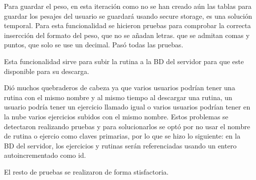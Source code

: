 Para guardar el peso, en esta iteración como no se han creado aún las tablas para guardar los pesajes del usuario se guardará usando secure storage, es una solución temporal. Para esta funcionalidad se hicieron pruebas para comprobar la correcta insercción del formato del peso, que no se añadan letras. que se admitan comas y puntos, que solo se use un decimal. Pasó todas las pruebas.


Esta funcionalidad sirve para subir la rutina a la BD del servidor para que este disponible para su descarga.

Dió muchos quebraderos de cabeza ya que varios usuarios podrían tener una rutina con el mismo nombre y al mismo tiempo al descargar una rutina, un usuario podría tener un ejercicio llamado igual o varios usuarios podrían tener en la nube varios ejercicios subidos con el mismo nombre. Estos problemas se detectaron realizando pruebas y para solucionarlos se optó por no usar el nombre de rutina o ejercio como claves primarias, por lo que se hizo lo siguiente: en la BD del servidor, los ejercicios y rutinas serán referenciadas usando un entero autoincrementado como id.

El resto de pruebas se realizaron de forma stisfactoria.

